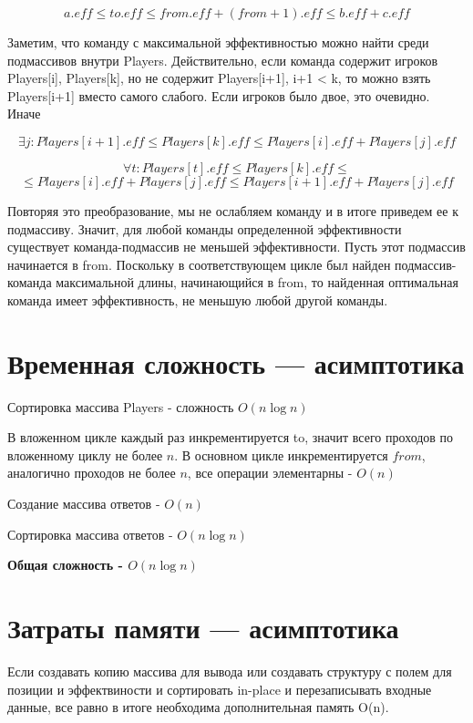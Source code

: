 \documentclass{article}
\renewcommand{\le}{\leqslant}  %
\begin{document}
$$a.eff \le to.eff \le from.eff + (from+1).eff  \le b.eff + c.eff  $$

Заметим, что команду с максимальной эффективностью можно найти среди подмассивов внутри Players. Действительно, если команда содержит игроков Players[i], Players[k], но не содержит Players[i+1], i+1 < k, то можно взять Players[i+1] вместо самого слабого. Если игроков было двое, это очевидно. Иначе 

$$\exists j: Players[i+1].eff \le Players[k].eff \le Players[i].eff + Players[j].eff$$

$$\forall t: Players[t].eff \le Players[k].eff \le$$
$$\le Players[i].eff +Players[j].eff \le Players[i+1].eff + Players[j].eff $$

Повторяя это преобразование, мы не ослабляем команду и в итоге приведем ее к подмассиву. Значит, для любой команды определенной эффективности существует команда-подмассив не меньшей эффективности. Пусть этот подмассив начинается в from. Поскольку в соответствующем цикле был найден подмассив-команда максимальной длины, начинающийся в from, то найденная оптимальная команда имеет эффективность, не меньшую любой другой команды.

\section{Временная сложность — асимптотика}

Сортировка массива Players - сложность $O(n\log n)$

В вложенном цикле каждый раз инкрементируется to, значит всего проходов по вложенному циклу не более $n$. В основном цикле инкрементируется $from$, аналогично проходов не более $n$, все операции элементарны - $O(n)$

Создание массива ответов - $O(n)$

Сортировка массива ответов - $O(n\log n)$

\textbf{Общая сложность - $O(n\log n)$}

\section{Затраты памяти — асимптотика}

Если создавать копию массива для вывода или создавать структуру с полем для позиции и эффектвиности и сортировать in-place и перезаписывать входные данные, все равно в итоге необходима дополнительная память O(n).
\end{document}
